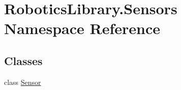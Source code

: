 \hypertarget{namespace_robotics_library_1_1_sensors}{}\section{Robotics\+Library.\+Sensors Namespace Reference}
\label{namespace_robotics_library_1_1_sensors}
\subsection*{Classes}
\begin{DoxyCompactItemize}
\item 
class \hyperlink{class_robotics_library_1_1_sensors_1_1_sensor}{Sensor}
\end{DoxyCompactItemize}
